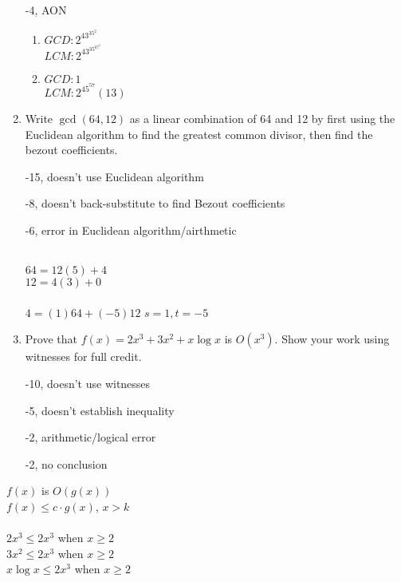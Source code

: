 \begin{enumerate}
\begin{rubric}
    -4, AON
\end{rubric}

\begin{solution}
\begin{enumerate}
    \item $GCD: 2^43^35^2$ \\ $LCM: 2^43^35^67^2$
    \item $GCD: 1$ \\ $LCM: 2^45^57(13)$
\end{enumerate}
\end{solution}

\item Write $\gcd(64,12)$ as a linear combination of 64 and 12 by first using the Euclidean algorithm to find the greatest common divisor, then find the bezout coefficients. 


\begin{rubric}
    -15, doesn't use Euclidean algorithm
    
    -8, doesn't back-substitute to find Bezout coefficients
    
    -6, error in Euclidean algorithm/airthmetic
\end{rubric}

\begin{solution}\\
$64=12(5)+4$\\
$12=4(3)+0$\\
 \\
$4=(1)64+(-5)12$
$s=1, t=-5$
\end{solution}

\item Prove that $f(x) = 2x^3 + 3x^2 + x\log{x}$ is $O(x^3)$. Show your work using witnesses for full credit. 
\begin{rubric}
-10, doesn't use witnesses

-5, doesn't establish inequality

-2, arithmetic/logical error

-2, no conclusion
\end{rubric}

\end{enumerate}

\begin{solution}
 $f(x)$ is $O(g(x))$\\
$f(x) \leq c \cdot g(x)$, $x>k$\\
\\
$2x^3 \leq 2x^3$ when $x \geq 2$ \\
$3x^2 \leq 2x^3$ when $x \geq 2$ \\
$x \log x \leq 2x^3$ when $x \geq 2$ \\
\end{solution}